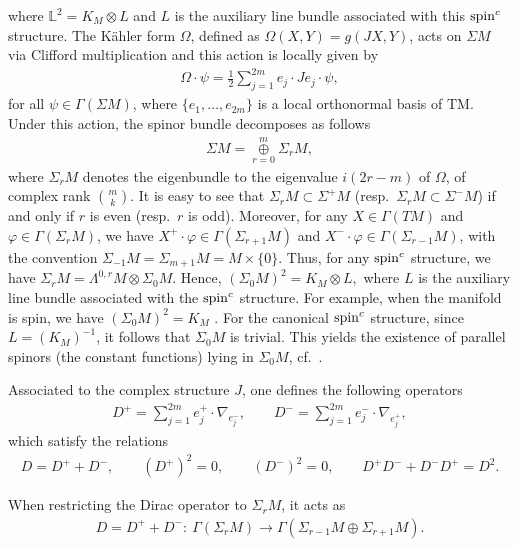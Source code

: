 \documentclass[pdftex]{sigma}
\numberwithin{equation}{section}
\theoremstyle{definition}
\begin{document}
where $\mathbb L^2 = K_M\otimes L$ and  $L$ is the auxiliary line bundle associated with this ${\mathop{\rm spin}^c}$ structure.
The K\"ahler form $\Omega$, def\/ined as $\Omega(X,Y)=g(JX,Y)$, acts on $\Sigma M$ via Clif\/ford multiplication
and this action is locally  given by
\begin{gather}\label{defomega}
\Omega\cdot \psi = \frac{1}{2} \sum_{j=1}^{2m} e_j\cdot Je_j\cdot\psi,
\end{gather}
for all $\psi\in\Gamma(\Sigma M)$, where $\{e_1, \dots, e_{2m}\}$ is a local orthonormal basis of $\mathrm{TM}$. Under this action, the spinor bundle decomposes as follows
\begin{gather}\label{decomp}
\Sigma M =\overset{m}{\underset{r=0}{\oplus}} \Sigma_r M,
\end{gather}
where $\Sigma_r M$ denotes the eigenbundle to the eigenvalue $i(2r-m)$ of $\Omega$, of complex rank $\binom{m}{k}$.
It is easy to see that $\Sigma_r M \subset \Sigma^+ M$ (resp.\ $\Sigma_r M \subset \Sigma^-M$) if and only if $r$ is even (resp.~$r$ is odd).
Moreover, for any $X \in \Gamma(TM)$ and $\varphi \in \Gamma(\Sigma_r M)$, we have $X^+ \cdot\varphi \in \Gamma(\Sigma_{r+1}M)$
and $X^-\cdot \varphi \in \Gamma(\Sigma_{r-1} M)$, with the convention $\Sigma_{-1}M=\Sigma_{m+1}M=M\times\{0\}$.
Thus, for any ${\mathop{\rm spin}^c}$ structure, we have
$\Sigma_r M = \Lambda^{0, r} M\otimes \Sigma_0 M$.
Hence, $(\Sigma_0M)^2 = K_M \otimes L,$ where $L$ is the auxiliary line bundle associated with the ${\mathop{\rm spin}^c}$ structure. For example, when the manifold is spin, we have $(\Sigma_0M)^2 = K_M$ \cite{hit, kirch86}.  For the canonical ${\mathop{\rm spin}^c}$ structure, since $L = (K_M)^{-1}$, it follows that $\Sigma_0 M$ is trivial. This yields the existence of parallel spinors (the constant functions) lying in $\Sigma_0M$, cf.~\cite{Moro1}.

Associated to the complex structure $J$, one def\/ines the following operators
\begin{gather*}%
D^+ =\sum_{j=1}^{2m}e_j^+\cdot \nabla_{e_j^-},\qquad D^- =\sum_{j=1}^{2m}e_j^-\cdot \nabla_{e_j^+},
\end{gather*}
which satisfy the relations
\begin{gather*} %
D=D^+ +D^-, \qquad (D^+)^2=0, \qquad (D^-)^2=0, \qquad D^+D^- + D^-D^+ =D^2.
\end{gather*}

When restricting the Dirac operator to $\Sigma_{r}M$, it acts as
\begin{gather*}
D=D^+ +D^-\colon \ \Gamma(\Sigma_{r}M) \to \Gamma(\Sigma_{r-1}M\oplus\Sigma_{r+1}M).
\end{gather*}
\end{document}
